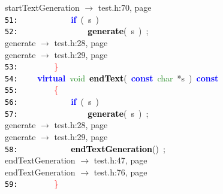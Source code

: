 \documentclass{article}
\begin{document}
\mbox{}{\hfill startTextGeneration $\rightarrow$ test.h:70, page~\pageref{test.h:70}} \\
\mbox{}\texttt{\textcolor{Black}{51:}} \ \ \ \ \ \ \ \ \ \ \ \ \textbf{\textcolor{Blue}{if}}\ \textcolor{BrickRed}{(}\ s\ \textcolor{BrickRed}{)} \\
\mbox{}\texttt{\textcolor{Black}{52:}} \ \ \ \ \ \ \ \ \ \ \ \ \ \ \ \ \textbf{\textcolor{Black}{generate}}\textcolor{BrickRed}{(}\ s\ \textcolor{BrickRed}{)}\ \textcolor{BrickRed}{;} \\
\mbox{}{\hfill generate $\rightarrow$ test.h:28, page~\pageref{test.h:28}} \\
\mbox{}{\hfill generate $\rightarrow$ test.h:29, page~\pageref{test.h:29}} \\
\mbox{}\texttt{\textcolor{Black}{53:}} \ \ \ \ \ \ \ \ \textcolor{Red}{\}} \\
\mbox{}\texttt{\textcolor{Black}{54:}} \ \ \ \ \textbf{\textcolor{Blue}{virtual}}\ \textcolor{ForestGreen}{void}\ \textbf{\textcolor{Black}{\label{test.h:54}endText}}\textcolor{BrickRed}{(}\ \textbf{\textcolor{Blue}{const}}\ \textcolor{ForestGreen}{char}\ \textcolor{BrickRed}{*}s\ \textcolor{BrickRed}{)}\ \textbf{\textcolor{Blue}{const}} \\
\mbox{}\texttt{\textcolor{Black}{55:}} \ \ \ \ \ \ \ \ \textcolor{Red}{\{} \\
\mbox{}\texttt{\textcolor{Black}{56:}} \ \ \ \ \ \ \ \ \ \ \ \ \textbf{\textcolor{Blue}{if}}\ \textcolor{BrickRed}{(}\ s\ \textcolor{BrickRed}{)} \\
\mbox{}\texttt{\textcolor{Black}{57:}} \ \ \ \ \ \ \ \ \ \ \ \ \ \ \ \ \textbf{\textcolor{Black}{generate}}\textcolor{BrickRed}{(}\ s\ \textcolor{BrickRed}{)}\ \textcolor{BrickRed}{;} \\
\mbox{}{\hfill generate $\rightarrow$ test.h:28, page~\pageref{test.h:28}} \\
\mbox{}{\hfill generate $\rightarrow$ test.h:29, page~\pageref{test.h:29}} \\
\mbox{}\texttt{\textcolor{Black}{58:}} \ \ \ \ \ \ \ \ \ \ \ \ \textbf{\textcolor{Black}{endTextGeneration}}\textcolor{BrickRed}{()}\ \textcolor{BrickRed}{;} \\
\mbox{}{\hfill endTextGeneration $\rightarrow$ test.h:47, page~\pageref{test.h:47}} \\
\mbox{}{\hfill endTextGeneration $\rightarrow$ test.h:76, page~\pageref{test.h:76}} \\
\mbox{}\texttt{\textcolor{Black}{59:}} \ \ \ \ \ \ \ \ \textcolor{Red}{\}} \\
\end{document}
